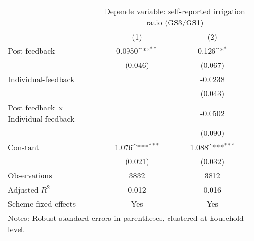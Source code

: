 {
\def\sym#1{\ifmmode^{#1}\else\(^{#1}\)\fi}
\begin{tabular}{l*{2}{c}}
\hline\hline
                    &\multicolumn{2}{c}{Depende variable: self-reported irrigation ratio (GS3/GS1)}\\\cmidrule(lr){2-3}
                    &\multicolumn{1}{c}{(1)}         &\multicolumn{1}{c}{(2)}         \\
\hline
Post-feedback       &      0.0950\sym{**} &       0.126\sym{*}  \\
                    &     (0.046)         &     (0.067)         \\
[1em]
Individual-feedback &                     &     -0.0238         \\
                    &                     &     (0.043)         \\
[1em]
Post-feedback $\times$ Individual-feedback&                     &     -0.0502         \\
                    &                     &     (0.090)         \\
[1em]
Constant            &       1.076\sym{***}&       1.088\sym{***}\\
                    &     (0.021)         &     (0.032)         \\
\hline
Observations        &        3832         &        3812         \\
Adjusted \(R^{2}\)  &       0.012         &       0.016         \\
Scheme fixed effects&         Yes         &         Yes         \\
\hline\hline
\multicolumn{3}{l}{\footnotesize Notes: Robust standard errors in parentheses, clustered at household level.}\\
\end{tabular}
}
